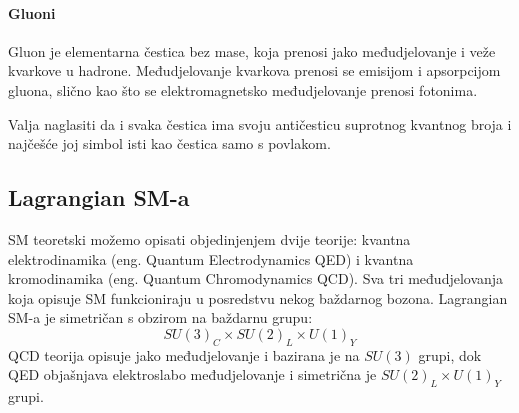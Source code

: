 \documentclass[12pt,a4paper,oneside]{article}
\begin{document}
\begin{linenumbers}
		\paragraph{Gluoni\newline}
		Gluon  je elementarna čestica bez mase, koja prenosi jako međudjelovanje i veže kvarkove u hadrone. Međudjelovanje kvarkova prenosi se emisijom i apsorpcijom gluona, slično kao što se elektromagnetsko međudjelovanje prenosi fotonima. 
		
		
		Valja naglasiti da i svaka čestica ima svoju antičesticu suprotnog kvantnog broja i najčešće joj simbol isti kao čestica samo s povlakom.
		
		
		\subsection{Lagrangian SM-a}
		SM teoretski možemo opisati objedinjenjem dvije teorije: kvantna elektrodinamika (eng. Quantum Electrodynamics QED) i kvantna kromodinamika (eng. Quantum Chromodynamics QCD). Sva tri međudjelovanja koja opisuje SM funkcioniraju u posredstvu nekog baždarnog bozona. Lagrangian SM-a je simetričan s obzirom na baždarnu grupu: 
		\begin{equation}
		SU(3)_C \times SU(2)_L \times U(1)_Y
		\end{equation}
		QCD teorija opisuje jako međudjelovanje i bazirana je na \begin{math}
		SU(3)
		\end{math}  grupi, dok  QED objašnjava elektroslabo međudjelovanje i simetrična je \begin{math}
		SU(2)_L \times U(1)_Y
		\end{math} grupi. ~\cite{doktorat}
		

\end{linenumbers}
\end{document}
